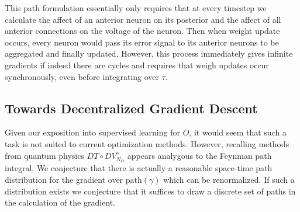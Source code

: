 	This path formulation essentially only requires that at every timestep we calculate the affect of an anterior neuron on its posterior and the affect of all anterior connections on the voltage of the neuron.  Then when weight update occurs, every neuron would pass its error signal to its anterior neurons to be aggregated and finally updated. However, this process immediately gives infinite gradients if indeed there are cycles and requires that weigh updates occur synchronously, even before integrating over $\tau.$

\subsection{Towards Decentralized Gradient Descent}
	Given our exposition into supervised learning for $O$, it would seem that such a task is not suited to current optimization methods. However, recalling methods from quantum physics $DT \circ DV^\gamma_{N_O}$ appears analygous to the Feynman path integral. We conjecture that there is actually a reasonable space-time path distribution for the gradient over $\text{path}(\gamma)$ which can be renormalized. If such a distribution exists we conjecture that it suffices to draw a discrete set of paths in the calculation of the gradient.



